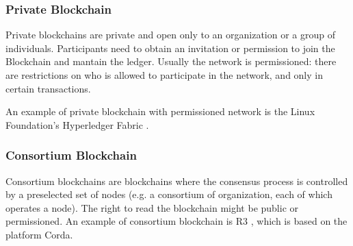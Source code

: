 \subsubsection*{Private Blockchain}
Private blockchains are private and open only to an organization or a group of
individuals. Participants need to obtain an invitation or permission to join the
Blockchain and mantain the ledger.
Usually the network is permissioned: there are restrictions on who
is allowed to participate in the network, and only in certain transactions.

An example of private blockchain with permissioned network is the Linux
Foundation's Hyperledger Fabric \cite{hyperledger-fabric}.

\subsubsection*{Consortium Blockchain}
Consortium blockchains are blockchains where the consensus process is controlled
by a preselected set of nodes (e.g. a consortium of organization, each of which
operates a node). The right to read the blockchain might be public or permissioned.
An example of consortium blockchain is R3 \cite{R3}, which is based on the platform Corda.
